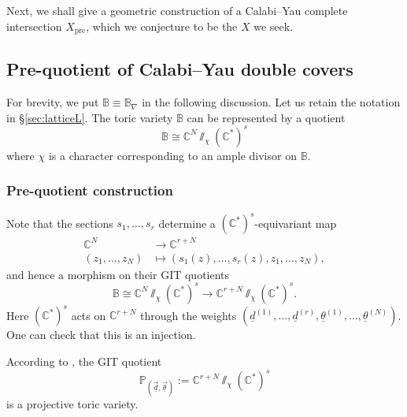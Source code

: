 \documentclass[12pt,a4paper,oneside]{amsart}
\numberwithin{equation}{section}
\theoremstyle{definition}
\theoremstyle{remark}
\newcommand{\Xpre}{X_{\mathrm{pre}}}
\begin{document}
Next, we shall give a geometric construction of a Calabi--Yau complete intersection $\Xpre$, which we conjecture to be the $X$ we seek.

\subsection{Pre-quotient of Calabi--Yau double covers}
\label{sec:prequotient}
For brevity, we put \(\mathbb{B}\equiv \mathbb{B}_{\nabla}\) in the following discussion.
Let us retain the notation in \S\ref{sec:latticeL}. The
toric variety \(\mathbb{B}\) can be represented by a quotient
\begin{equation*}
    \mathbb{B}\cong \mathbb{C}^{N}\sslash_{\chi} (\mathbb{C}^{\ast})^{s}
\end{equation*}
where \(\chi\) is a character corresponding to an ample divisor on \(\mathbb{B}\).

\subsubsection{Pre-quotient construction}

Note that the sections \(s_{1},\ldots,s_{r}\) determine a \((\mathbb{C}^{\ast})^{s}\)-equivariant map
\begin{equation*}
\begin{aligned}
    \mathbb{C}^{N} &\to \mathbb{C}^{r+N}\\
    (z_{1},\ldots,z_{N})&\mapsto  (s_{1}(z),\ldots,s_{r}(z),z_{1},\ldots,z_{N}) ,
\end{aligned}
\end{equation*}
and hence a morphism on their GIT quotients
\begin{equation*}
    \mathbb{B}\cong \mathbb{C}^{N}\sslash_{\chi} (\mathbb{C}^{\ast})^{s}\to \mathbb{C}^{r+N}\sslash_{\chi} (\mathbb{C}^{\ast})^{s}.
\end{equation*}
Here \((\mathbb{C}^{\ast})^{s}\) acts on \(\mathbb{C}^{r+N}\) through
the weights \((\underline{d}^{(1)}, \dots, \underline{d}^{(r)},\underline{\theta}^{(1)}, \dots, \underline{\theta}^{(N)})\).
One can check that this is an injection.

According to \cite[Proposition 14.3.10]{Cox:2011tor}, the GIT quotient
\begin{equation*}
    \mathbb{P}_{(\vec{\underline{d}}, \vec{\underline{\theta}})}:=
    \mathbb{C}^{r+N}\sslash_{\chi} (\mathbb{C}^{\ast})^{s}
\end{equation*}
is a projective toric variety. 
\end{document}
